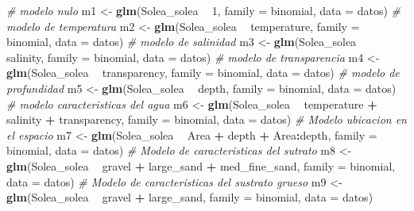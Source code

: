 \documentclass[
]{book}
\newenvironment{Shaded}{\begin{snugshade}}{\end{snugshade}}
\newcommand{\CommentTok}[1]{\textcolor[rgb]{0.56,0.35,0.01}{\textit{#1}}}
\newcommand{\DataTypeTok}[1]{\textcolor[rgb]{0.13,0.29,0.53}{#1}}
\newcommand{\DecValTok}[1]{\textcolor[rgb]{0.00,0.00,0.81}{#1}}
\newcommand{\KeywordTok}[1]{\textcolor[rgb]{0.13,0.29,0.53}{\textbf{#1}}}
\newcommand{\NormalTok}[1]{#1}
\newcommand{\OperatorTok}[1]{\textcolor[rgb]{0.81,0.36,0.00}{\textbf{#1}}}
\newcommand{\StringTok}[1]{\textcolor[rgb]{0.31,0.60,0.02}{#1}}
\begin{document}
\begin{Shaded}
\begin{Highlighting}[]
\CommentTok{# modelo nulo}
\NormalTok{m1 <-}\StringTok{ }\KeywordTok{glm}\NormalTok{(Solea_solea }\OperatorTok{~}\StringTok{ }\DecValTok{1}\NormalTok{, }\DataTypeTok{family =}\NormalTok{ binomial, }\DataTypeTok{data =}\NormalTok{ datos)}
\CommentTok{# modelo de temperatura}
\NormalTok{m2 <-}\StringTok{ }\KeywordTok{glm}\NormalTok{(Solea_solea }\OperatorTok{~}\StringTok{ }\NormalTok{temperature, }\DataTypeTok{family =}\NormalTok{ binomial, }\DataTypeTok{data =}\NormalTok{ datos)}
\CommentTok{# modelo de salinidad}
\NormalTok{m3 <-}\StringTok{ }\KeywordTok{glm}\NormalTok{(Solea_solea }\OperatorTok{~}\StringTok{ }\NormalTok{salinity, }\DataTypeTok{family =}\NormalTok{ binomial, }\DataTypeTok{data =}\NormalTok{ datos)}
\CommentTok{# modelo de transparencia}
\NormalTok{m4 <-}\StringTok{ }\KeywordTok{glm}\NormalTok{(Solea_solea }\OperatorTok{~}\StringTok{ }\NormalTok{transparency, }\DataTypeTok{family =}\NormalTok{ binomial, }\DataTypeTok{data =}\NormalTok{ datos)}
\CommentTok{# modelo de profundidad}
\NormalTok{m5 <-}\StringTok{ }\KeywordTok{glm}\NormalTok{(Solea_solea }\OperatorTok{~}\StringTok{ }\NormalTok{depth, }\DataTypeTok{family =}\NormalTok{ binomial, }\DataTypeTok{data =}\NormalTok{ datos)}
\CommentTok{# modelo caracteristicas del agua}
\NormalTok{m6 <-}\StringTok{ }\KeywordTok{glm}\NormalTok{(Solea_solea }\OperatorTok{~}\StringTok{ }\NormalTok{temperature }\OperatorTok{+}\StringTok{ }\NormalTok{salinity }\OperatorTok{+}\StringTok{ }\NormalTok{transparency, }\DataTypeTok{family =}\NormalTok{ binomial, }\DataTypeTok{data =}\NormalTok{ datos)}
\CommentTok{# Modelo ubicacion en el espacio}
\NormalTok{m7 <-}\StringTok{ }\KeywordTok{glm}\NormalTok{(Solea_solea }\OperatorTok{~}\StringTok{ }\NormalTok{Area }\OperatorTok{+}\StringTok{ }\NormalTok{depth }\OperatorTok{+}\StringTok{ }\NormalTok{Area}\OperatorTok{:}\NormalTok{depth, }\DataTypeTok{family =}\NormalTok{ binomial, }\DataTypeTok{data =}\NormalTok{ datos)}
\CommentTok{# Modelo de caracteristicas del sutrato}
\NormalTok{m8 <-}\StringTok{ }\KeywordTok{glm}\NormalTok{(Solea_solea }\OperatorTok{~}\StringTok{ }\NormalTok{gravel }\OperatorTok{+}\StringTok{ }\NormalTok{large_sand }\OperatorTok{+}\StringTok{ }\NormalTok{med_fine_sand, }\DataTypeTok{family =}\NormalTok{ binomial, }\DataTypeTok{data =}\NormalTok{ datos)}
\CommentTok{# Modelo de caracteristicas del sustrato grueso}
\NormalTok{m9 <-}\StringTok{ }\KeywordTok{glm}\NormalTok{(Solea_solea }\OperatorTok{~}\StringTok{ }\NormalTok{gravel }\OperatorTok{+}\StringTok{ }\NormalTok{large_sand, }\DataTypeTok{family =}\NormalTok{ binomial, }\DataTypeTok{data =}\NormalTok{ datos)}

\end{Highlighting}
\end{Shaded}
\end{document}
